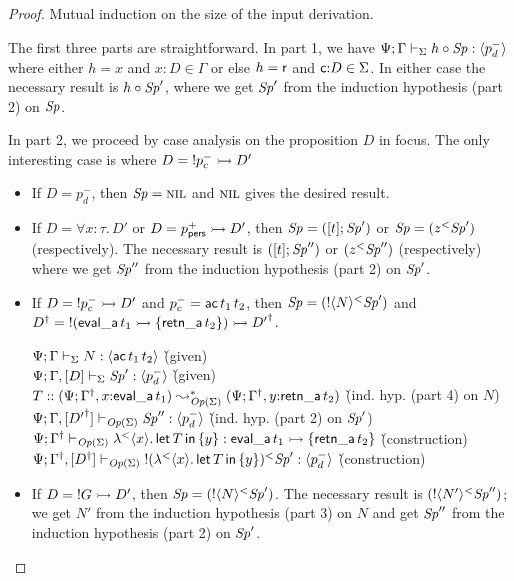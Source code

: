 \begin{proof}
Mutual induction on the size 
of the input derivation.

The first three parts are straightforward. In part 1, we have
${\Psi}; {\Gamma} \vdash_{\Sigma} {{h} \circ {{\it Sp}}} : {\langle {p^-_d} \rangle}$ where
either $h = x$ and $x{:}D \in \Gamma$ or else $h = {\sf r}$ and ${\sf
  c}{:}D \in \Sigma$. In either case the necessary result is
${h} \circ {{\it Sp}'}$, where we get ${\it Sp}'$ from the induction hypothesis
(part 2) on ${\it Sp}$.

In part 2, we proceed by case analysis on the proposition $D$ in focus. 
The only interesting case is where $D = {!}p^-_c \rightarrowtail D'$
\begin{itemize}
\item If $D = p_d^-$, then ${\it Sp} = \textsc{nil}$ and $\textsc{nil}$ gives the desired result.

\item If $D = \forall x{:}\tau.\,D'$ or $D = p^+_{\sf
    pers} \rightarrowtail D'$, then ${\it Sp} = ([{t}]; {{\it Sp}'})$ 
  or ${\it Sp} = ({z}{^{<}}{{\it Sp}'})$ (respectively). The necessary result is
  $([{t}]; {{\it Sp}''})$ 
  or $({z}{^{<}}{{\it Sp}''})$ (respectively) where we get ${\it Sp}''$ from the
  induction hypothesis (part 2) on ${\it Sp}'$. 

\item If $D = {!}p^-_c \rightarrowtail D'$ and $p^-_c = {\sf ac}\,t_1\,t_2$, then 
  ${\it Sp} = ({{!}{\langle {N} \rangle}}{^{<}}{{\it Sp}'})$
  and ${{D}^\dag} = {!}({\sf eval\_a}\,t_1 \rightarrowtail \{ {\sf retn\_a}\,t_2 \}) \rightarrowtail {{D'}^\dag}$.

  \begin{tabbing}
  ${\Psi}; {\Gamma} \vdash_{\Sigma} {N} : {\langle {{\sf ac}\,t_1\,t_2} \rangle}$
  \` (given)
  \\
  ${\Psi}; {\Gamma, [D]} \vdash_{\Sigma} {{\it Sp}'} : {\langle {p^-_d} \rangle}$
  \` (given)
  \\
  $T :: (\Psi; {{\Gamma}^\dag}, x{:}{\sf eval\_a}\,t_1)
    \leadsto^*_{{\it Op}({\Sigma})} (\Psi; {{\Gamma}^\dag}, y{:}{\sf retn\_a}\,t_2)$
  \` (ind. hyp. (part 4) on $N$)
  \\
  ${\Psi}; {\Gamma, [{{D'}^\dag}]} \vdash_{{\it Op}({\Sigma})} {{\it Sp}''} : {\langle {p_d^-} \rangle}$
  \` (ind. hyp. (part 2) on ${\it Sp}'$)
  \\
  ${\Psi}; {{{\Gamma}^\dag}} \vdash_{{\it Op}({\Sigma})} {{\lambda}^{<}{\langle {x} \rangle . {\,{\sf let}\,{T}\,{\sf in}\,\{ {y} \}}}} : {{\sf eval\_a}\,t_1 \rightarrowtail \{ {\sf retn\_a}\,t_2 \}}$
  \` (construction)
  \\
  ${\Psi}; {{{\Gamma}^\dag}, [{{D}^\dag}]} \vdash_{{\it Op}({\Sigma})} {{{!}{({\lambda}^{<}{\langle {x} \rangle . {\,{\sf let}\,{T}\,{\sf in}\,\{ {y} \}}})}}{^{<}}{{\it Sp}'}} : {\langle {p^-_d} \rangle}$
  \` (construction)
  \end{tabbing}
\item If $D = {!}G \rightarrowtail D'$, then ${\it Sp} =
  ({{!}{\langle {N} \rangle}}{^{<}}{{\it Sp}'})$. The necessary result is
  $({{!}{\langle {N'} \rangle}}{^{<}}{{\it Sp}''})$; we get $N'$ from the
  induction hypothesis (part 3) on $N$ and get ${\it Sp}''$ from the induction
  hypothesis (part 2) on ${\it Sp}'$.
\end{itemize}


\end{proof}
